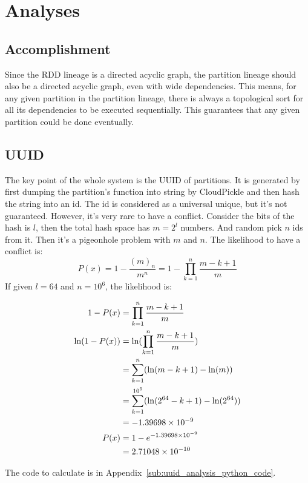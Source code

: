 
\section{Analyses} %
\label{sec:analyses}

\subsection{Accomplishment} %
\label{sub:accomplishment}
Since the RDD lineage is a directed acyclic graph,
the partition lineage should also be a directed acyclic graph, even with wide dependencies.
This means, for any given partition in the partition lineage,
there is always a topological sort for all its dependencies to be executed sequentially.
This guarantees that any given partition could be done eventually.

\subsection{UUID} %
\label{sub:uuid}
The key point of the whole system is the UUID of partitions.
It is generated by first dumping the partition's function into string by CloudPickle and then hash the string into an id.
The id is considered as a universal unique, but it's not guaranteed.
However, it's very rare to have a conflict.
Consider the bits of the hash is $l$, then the total hash space has $m=2^l$ numbers.
And random pick $n$ ids from it.
Then it's a pigeonhole problem\cite{pigeonhole} with $m$ and $n$.
The likelihood to have a conflict is:
$$P(x) = 1 - \frac{{(m)}_n}{m^n} = 1 - \prod\limits_{k = 1}^n\frac{m - k + 1}{m}$$
If given $l=64$ and $n=10^6$, the likelihood is:

\begin{align*}
1 - P(x) &= \prod\limits_{k = 1}^n\frac{m - k + 1}{m} \\
\ln(1 - P(x)) &= \ln(\prod\limits_{k = 1}^n\frac{m - k + 1}{m}) \\
&= \sum\limits_{k = 1}^n(\ln(m-k+1) - \ln(m)) \\
&= \sum\limits_{k=1}^{10^5}(\ln(2^{64}-k+1) - \ln(2^{64})) \\
&= -1.39698\times 10^{-9} \\
P(x) &= 1 - e^{-1.39698\times 10^{-9}} \\
&= 2.71048\times 10^{-10}
\end{align*}

The code to calculate is in Appendix~\ref{sub:uuid_analysis_python_code}.

